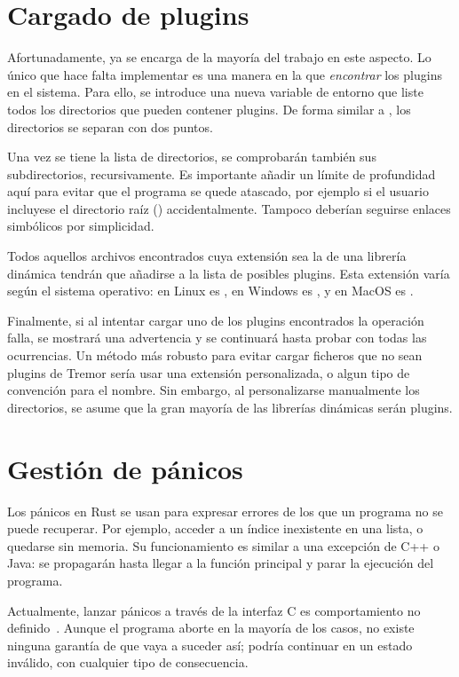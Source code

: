 \section{Cargado de plugins}

Afortunadamente, \abistable ya se encarga de la mayoría del trabajo en este
aspecto. Lo único que hace falta implementar es una manera en la que
\emph{encontrar} los plugins en el sistema. Para ello, se introduce una nueva
variable de entorno  que liste todos los directorios
que pueden contener plugins. De forma similar a , los directorios se
separan con dos puntos.

Una vez se tiene la lista de directorios, se comprobarán también sus
subdirectorios, recursivamente. Es importante añadir un límite de profundidad
aquí para evitar que el programa se quede atascado, por ejemplo si el usuario
incluyese el directorio raíz (\code{/}) accidentalmente. Tampoco deberían
seguirse enlaces simbólicos por simplicidad.

Todos aquellos archivos encontrados cuya extensión sea la de una librería
dinámica tendrán que añadirse a la lista de posibles plugins. Esta extensión
varía según el sistema operativo: en Linux es , en Windows es
, y en MacOS es .

Finalmente, si al intentar cargar uno de los plugins encontrados la operación
falla, se mostrará una advertencia y se continuará hasta probar con todas las
ocurrencias. Un método más robusto para evitar cargar ficheros que no sean
plugins de Tremor sería usar una extensión personalizada, o algun tipo de
convención para el nombre. Sin embargo, al personalizarse manualmente los
directorios, se asume que la gran mayoría de las librerías dinámicas serán
plugins.

\section{Gestión de pánicos}\label{sec:panics}

Los pánicos en Rust se usan para expresar errores de los que un programa no se
puede recuperar. Por ejemplo, acceder a un índice inexistente en una lista, o
quedarse sin memoria. Su funcionamiento es similar a una excepción de C++ o
Java: se propagarán hasta llegar a la función principal y parar la ejecución del
programa.

Actualmente, lanzar pánicos a través de la interfaz C es comportamiento no
definido~\cite[FFI and Panics]{nomicon}. Aunque el programa aborte en la mayoría
de los casos, no existe ninguna garantía de que vaya a suceder así; podría
continuar en un estado inválido, con cualquier tipo de consecuencia.

